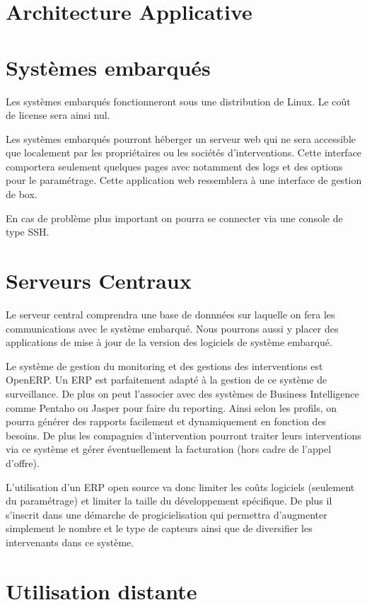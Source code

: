 \section{Architecture Applicative}

\section{Systèmes embarqués}

Les systèmes embarqués fonctionneront sous une distribution de Linux. Le
coût de license sera ainsi nul. 

Les systèmes embarqués pourront héberger un serveur web qui ne sera
accessible que localement par les propriétaires ou les sociétés
d'interventions. Cette interface comportera seulement quelques pages avec
notamment des logs et des options pour le paramétrage. Cette application
web ressemblera à une interface de gestion de box.

En cas de problème plus important on pourra se connecter via une console de
type SSH.

\section{Serveurs Centraux}

Le serveur central comprendra une base de donnnées sur laquelle on fera les
communications avec le système embarqué. Nous pourrons aussi y placer des
applications de mise à jour de la version des logiciels de système
embarqué. 

Le système de gestion du monitoring et des gestions des interventions est
OpenERP. Un ERP est parfaitement adapté à la gestion de ce système de
surveillance. De plus on peut l'associer avec des systèmes de Business
Intelligence comme Pentaho ou Jasper pour faire du reporting. Ainsi selon
les profils, on pourra générer des rapports facilement et dynamiquement en
fonction des besoins.  De plus les compagnies d'intervention pourront
traiter leurs interventions via ce système et gérer éventuellement la
facturation (hors cadre de l'appel d'offre).

L'utilisation d'un ERP open source va donc limiter les coûts logiciels
(seulement du paramétrage) et limiter la taille du développement
spécifique. De plus il s'inscrit dans une démarche de progicielisation qui
permettra d'augmenter simplement le nombre et le type de capteurs ainsi que
de diversifier les intervenants dans ce système.

\section{Utilisation distante}

